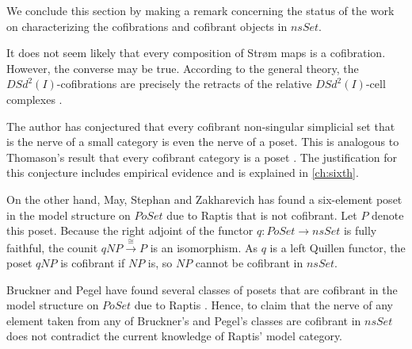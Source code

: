 We conclude this section by making a remark concerning the status of the work on characterizing the cofibrations and cofibrant objects in $nsSet$.
\begin{remark}
It does not seem likely that every composition of Str\o m maps is a cofibration. However, the converse may be true. According to the general theory, the $DSd^2(I)$-cofibrations are precisely the retracts of the relative $DSd^2(I)$-cell complexes \cite[Cor.~10.5.23, p.~200]{Hi03}.

The author has conjectured that every cofibrant non-singular simplicial set that is the nerve of a small category is even the nerve of a poset. This is analogous to Thomason's result that every cofibrant category is a poset \cite[Prop.~5.7]{Th80}. The justification for this conjecture includes empirical evidence and is explained in \cref{ch:sixth}.

On the other hand, May, Stephan and Zakharevich \cite[p.~13]{MSZ17} has found a six-element poset in the model structure on $PoSet$ due to Raptis \cite{Ra10} that is not cofibrant. Let $P$ denote this poset. Because the right adjoint of the functor $q:PoSet\to nsSet$ is fully faithful, the counit $qNP\xrightarrow{\cong } P$ is an isomorphism. As $q$ is a left Quillen functor, the poset $qNP$ is cofibrant if $NP$ is, so $NP$ cannot be cofibrant in $nsSet$.

Bruckner and Pegel \cite{BP16} have found several classes of posets that are cofibrant in the model structure on $PoSet$ due to Raptis \cite{Ra10}. Hence, to claim that the nerve of any element taken from any of Bruckner's and Pegel's classes are cofibrant in $nsSet$ does not contradict the current knowledge of Raptis' model category.
\end{remark}


